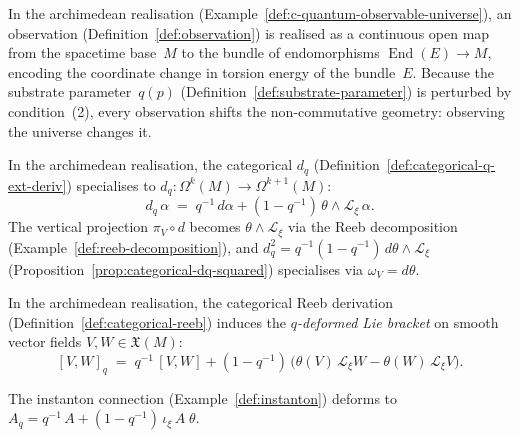 \begin{remark}
\label{rem:observation-archimedean}
In the archimedean realisation
(Example~\ref{def:c-quantum-observable-universe}), an observation
(Definition~\ref{def:observation}) is realised as a continuous open map
from the spacetime base~$M$ to the bundle of endomorphisms
$\operatorname{End}(E) \to M$, encoding the coordinate change in torsion
energy of the bundle~$E$.  Because the substrate parameter~$q(p)$
(Definition~\ref{def:substrate-parameter}) is perturbed by
condition~(2), every observation shifts the non-commutative geometry:
observing the universe changes it.
\end{remark}


\begin{example}
\label{def:q-ext-deriv}
\leanok
In the archimedean realisation, the categorical $d_q$
(Definition~\ref{def:categorical-q-ext-deriv}) specialises to
$d_q \colon \Omega^k(M) \to \Omega^{k+1}(M)$:
\[
  d_q\,\alpha
  \;=\; q^{-1}\,d\alpha
        + (1 - q^{-1})\,\theta \wedge \mathcal{L}_\xi\,\alpha.
\]
The vertical projection $\pi_V \circ d$ becomes
$\theta \wedge \mathcal{L}_\xi$ via the Reeb decomposition
(Example~\ref{def:reeb-decomposition}), and
$d_q^2 = q^{-1}(1-q^{-1})\,d\theta \wedge \mathcal{L}_\xi$
(Proposition~\ref{prop:categorical-dq-squared}) specialises via
$\omega_V = d\theta$.
\end{example}

\begin{example}
\label{def:q-lie-bracket}
\leanok
In the archimedean realisation, the categorical Reeb derivation
(Definition~\ref{def:categorical-reeb}) induces the \emph{$q$-deformed
Lie bracket} on smooth vector fields $V, W \in \mathfrak{X}(M)$:
\[
  [V, W]_q
  \;=\; q^{-1}\,[V, W]
        + (1 - q^{-1})\,\bigl(\theta(V)\,\mathcal{L}_\xi W
                              - \theta(W)\,\mathcal{L}_\xi V\bigr).
\]
\end{example}

\begin{example}
\label{def:q-connection}
\leanok
The instanton connection (Example~\ref{def:instanton}) deforms to
$A_q = q^{-1}\,A + (1 - q^{-1})\,\iota_\xi\,A\;\theta$.
\end{example}

